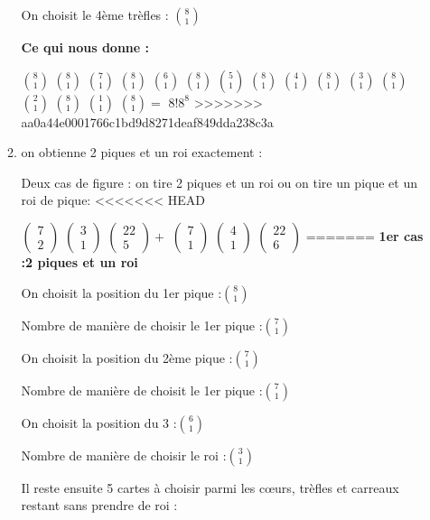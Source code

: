 \documentclass[a4paper,10pt]{article}
\begin{document}
\begin{enumerate}
\begin{enumerate}
		On choisit le 4ème trèfles :		
		$\binom{8}{1}$
		
		\textbf{Ce qui nous donne :}
		
		$\binom{8}{1}$
		$\binom{8}{1}$
		$\binom{7}{1}$
		$\binom{8}{1}$
		$\binom{6}{1}$
		$\binom{8}{1}$
		$\binom{5}{1}$
		$\binom{8}{1}$
		$\binom{4}{1}$
		$\binom{8}{1}$
		$\binom{3}{1}$
		$\binom{8}{1}$
		$\binom{2}{1}$
		$\binom{8}{1}$
		$\binom{1}{1}$
		$\binom{8}{1}=$
		$8!8^8$
>>>>>>> aa0a44e0001766c1bd9d8271deaf849dda238c3a
		
		\item on obtienne 2 piques et un roi exactement :
		
		Deux cas de figure : on tire 2 piques et un roi ou on tire un pique et un roi de pique:
<<<<<<< HEAD
		
		$\left(\begin{array}{c} 7 \\ 2 \end{array} \right)$
		$\left(\begin{array}{c} 3 \\ 1 \end{array} \right)$
		$\left(\begin{array}{c} 22 \\ 5 \end{array} \right)+$
		$\left(\begin{array}{c} 7 \\ 1 \end{array} \right)$
		$\left(\begin{array}{c} 4 \\ 1 \end{array} \right)$
		$\left(\begin{array}{c} 22 \\ 6 \end{array} \right)$
=======
		\textbf{1er cas :2 piques et un roi}
		
		On choisit la position du 1er pique :$\binom{8}{1}$
		
		Nombre de manière de choisir le 1er pique :$\binom{7}{1}$
		
		On choisit la position du 2ème pique :$\binom{7}{1}$
		
		Nombre de manière de choisit le 1er pique :$\binom{7}{1}$
		
		On choisit la position du 3 :$\binom{6}{1}$
		
		Nombre de manière de choisir le roi :$\binom{3}{1}$
		
		Il reste ensuite 5 cartes à choisir parmi les cœurs, trèfles et carreaux restant 				sans prendre de roi :
		

\end{enumerate}
\end{enumerate}
\end{document}
